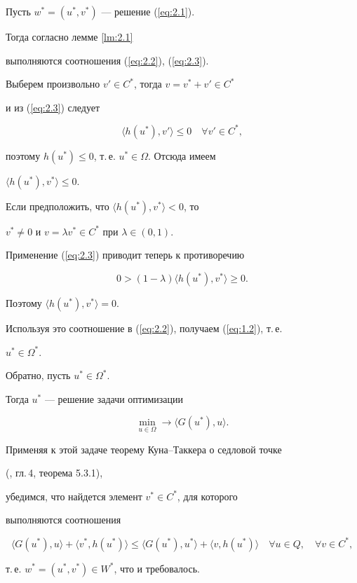 \begin{pf}


Пусть $w^*=(u^*, v^*)$ --- решение (\ref{eq:2.1}).


Тогда согласно лемме \ref{lm:2.1}


выполняются соотношения (\ref{eq:2.2}), (\ref{eq:2.3}).


Выберем произвольно $v' \in C^*$, тогда $v=v^*+v' \in C^*$ 


и из (\ref{eq:2.3}) следует


$$


\langle h(u^*), v' \rangle \leq 0 \quad \forall v' \in C^*,


$$


поэтому $h(u^*) \leq 0$, т.\,е. $u^* \in \Omega $. Отсюда имеем 


$\langle h(u^*), v^*\rangle \leq 0$. 


Если предположить, что $\langle h(u^*), v^*\rangle < 0$, то 


$v^* \neq 0$ и $v=\lambda v^* \in C^*$ при $\lambda \in (0,1)$. 


Применение (\ref{eq:2.3}) приводит теперь к противоречию 


$$


0 > (1- \lambda) \langle h(u^*), v^*\rangle \geq 0.


$$


Поэтому $\langle h(u^*), v^*\rangle=0$. 


Используя это соотношение в (\ref{eq:2.2}), получаем (\ref{eq:1.2}), т.\,е. 


$u^* \in \Omega^*$.





Обратно, пусть $u^* \in \Omega^*$.


Тогда $u^*$ --- решение задачи оптимизации


$$


\min_{u \in \Omega} \rightarrow \langle G(u^*), u \rangle .


$$


Применяя к этой задаче теорему Куна--Таккера о седловой точке


(\cite{EGU62}, гл.\,4, теорема 5.3.1),


убедимся, что найдется элемент $v^* \in C^*$, для которого


выполняются соотношения


$$


\langle G(u^*), u \rangle+\langle v^*, h(u^*) \rangle \leq 


\langle G(u^*),u^* \rangle+\langle v, h(u^*) \rangle \quad \forall u \in Q, 


\quad \forall v \in C^*,


$$


т.\,е. $w^*=(u^*, v^*) \in W^*$, что и требовалось.


\end{pf}





